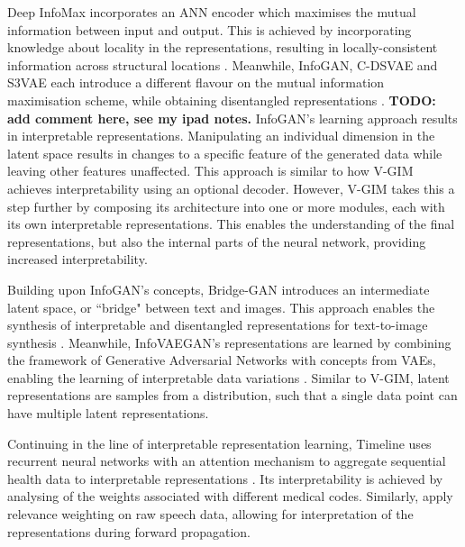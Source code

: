 	Deep InfoMax incorporates an ANN encoder which maximises the mutual information between input and output. This is achieved by incorporating knowledge about locality in the representations, resulting in locally-consistent information across structural locations \citep{hjelmLearningDeepRepresentations2019}. Meanwhile, InfoGAN, C-DSVAE and S3VAE each introduce a different flavour on the mutual information maximisation scheme, while obtaining disentangled representations \citep{chenInfoGANInterpretableRepresentation2016, baiContrastivelyDisentangledSequential2021, zhuS3VAESelfSupervisedSequential2020}. \textbf{TODO: add comment here, see my ipad notes.} 
	InfoGAN's learning approach results in interpretable representations. Manipulating an individual dimension in the latent space results in changes to a specific feature of the generated data while leaving other features unaffected. This approach is similar to how V-GIM achieves interpretability using an optional decoder. However, V-GIM takes this a step further by composing its architecture into one or more modules, each with its own interpretable representations. This enables the understanding of the final representations, but also the internal parts of the neural network, providing increased interpretability.
	
	Building upon InfoGAN's concepts, Bridge-GAN introduces an intermediate latent space, or ``bridge" between text and images. This approach enables the synthesis of interpretable and disentangled representations for text-to-image synthesis \citep{yuanBridgeGANInterpretableRepresentation2020a}. Meanwhile, InfoVAEGAN's representations are learned by combining the framework of Generative Adversarial Networks with concepts from VAEs, enabling the learning of interpretable data variations \citep{yeInfoVAEGANLearningJoint2021}. Similar to V-GIM, latent representations are samples from a distribution, such that a single data point can have multiple latent representations.
	
	Continuing in the line of interpretable representation learning, Timeline uses recurrent neural networks with an attention mechanism to aggregate sequential health data to interpretable representations \citep{baiInterpretableRepresentationLearning2018}. Its interpretability is achieved by analysing of the weights associated with different medical codes. Similarly, \cite{agrawalInterpretableRepresentationLearning2020} apply relevance weighting on raw speech data, allowing for interpretation of the representations during forward propagation. 
	
